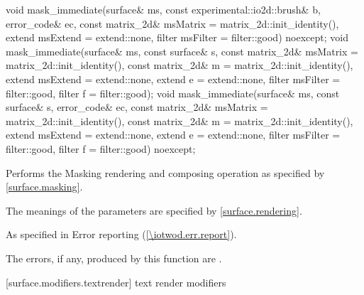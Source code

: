 \begin{itemdecl}
void mask_immediate(surface& ms, const experimental::io2d::brush& b,
  error_code& ec, const matrix_2d& msMatrix = matrix_2d::init_identity(),
  extend msExtend = extend::none, filter msFilter = filter::good) noexcept;
void mask_immediate(surface& ms, const surface& s, 
  const matrix_2d& msMatrix = matrix_2d::init_identity(),
  const matrix_2d& m = matrix_2d::init_identity(),
  extend msExtend = extend::none, extend e = extend::none,
  filter msFilter = filter::good, filter f = filter::good);
void mask_immediate(surface& ms, const surface& s, error_code& ec,
  const matrix_2d& msMatrix = matrix_2d::init_identity(),
  const matrix_2d& m = matrix_2d::init_identity(),
  extend msExtend = extend::none, extend e = extend::none,
  filter msFilter = filter::good, filter f = filter::good) noexcept;
\end{itemdecl}
\begin{itemdescr}
\pnum
\effects
Performs the Masking rendering and composing operation as specified by \ref{surface.masking}.

\pnum
The meanings of the parameters are specified by \ref{surface.rendering}.

\pnum
\throws
As specified in Error reporting (\ref{\iotwod.err.report}).

\pnum
\errors
The errors, if any, produced by this function are .
\end{itemdescr}

 [surface.modifiers.textrender] { text render modifiers}

